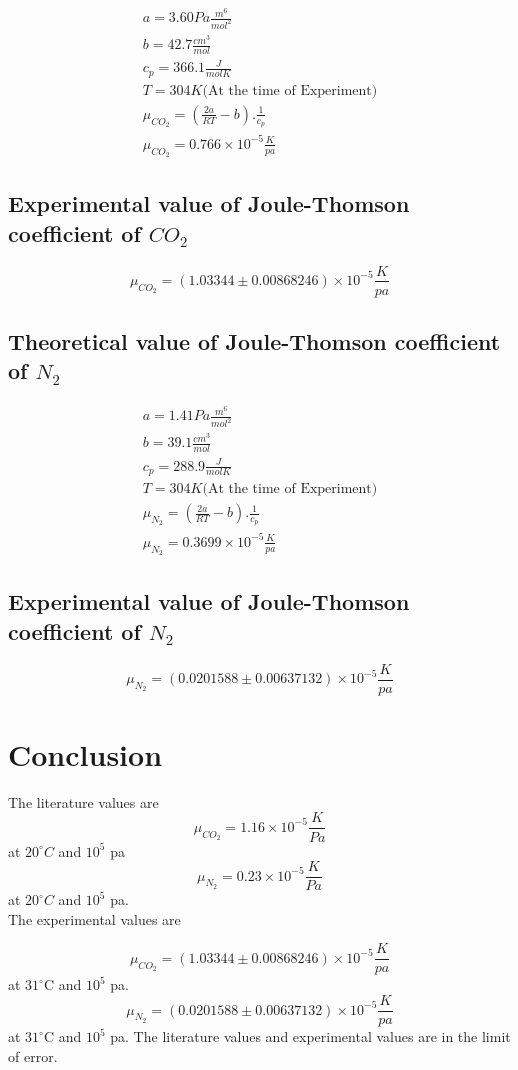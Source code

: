 \documentclass[
	letterpaper, %
	10pt, %
]{CSUniSchoolLabReport}
\begin{document}
\begin{gather*}	
	a = 3.60 Pa \frac{m^6}{mol^2}\\
	b = 42.7 \frac{cm^3}{mol}\\
	c_p = 366.1 \frac{J}{mol K}\\
	T = 304 K \text{(At the time of Experiment)}\\
	\mu_{CO_2} = \left(\frac{2a}{RT} - b\right). \frac{1}{c_p}\\
	\boxed{\mu_{CO_2} = 0.766 \times 10^{-5} \frac{K}{pa}}
\end{gather*}
\subsection{Experimental value of Joule-Thomson coefficient of \(CO_2\)}

\[
	\boxed{\mu_{CO_2} = (1.03344 \pm 0.00868246) \times  10^{-5} \frac{K}{pa}}
\]

\subsection{Theoretical value of Joule-Thomson coefficient of \(N_{2}\)}

\begin{gather*}	
	a =  1.41 Pa \frac{m^6}{mol^2}\\
	b =  39.1 \frac{cm^3}{mol}\\
	c_p = 288.9 \frac{J}{mol K}\\
	T = 304 K \text{(At the time of Experiment)}\\
	\mu_{N_2} = \left(\frac{2a}{RT} - b\right). \frac{1}{c_p}\\
	\boxed{\mu_{N_2} = 0.3699 \times 10^{-5} \frac{K}{pa}}
\end{gather*}

\subsection{Experimental value of Joule-Thomson coefficient of \(N_2\)}

\[
	\boxed{\mu_{N_2} = (0.0201588 \pm 0.00637132 ) \times 10^{-5} \frac{K}{pa}}	
\]

\section{Conclusion}
The literature values are 
\[
	\mu_{CO_2} = 1.16 \times 10^{-5} \frac{K}{Pa} 
\]
at \(20^{\circ}C\) and $10^{5}$ pa
\[
	\mu_{N_2} = 0.23 \times 10^{-5} \frac{K}{Pa}
\]
at \(20^{\circ}C\) and $10^{5}$ pa. \\

The experimental values are 

\[
	\boxed{\mu_{CO_2} = (1.03344 \pm 0.00868246) \times  10^{-5} \frac{K}{pa}}
\]
at \(31 ^{\circ}\)C and \(10^5\) pa.
\[
	\boxed{\mu_{N_2} = (0.0201588 \pm 0.00637132 ) \times 10^{-5} \frac{K}{pa}}	
\]
at \(31 ^{\circ}\)C and \(10^5\) pa. 
The literature values and experimental values are in the limit of error.

\end{document}
